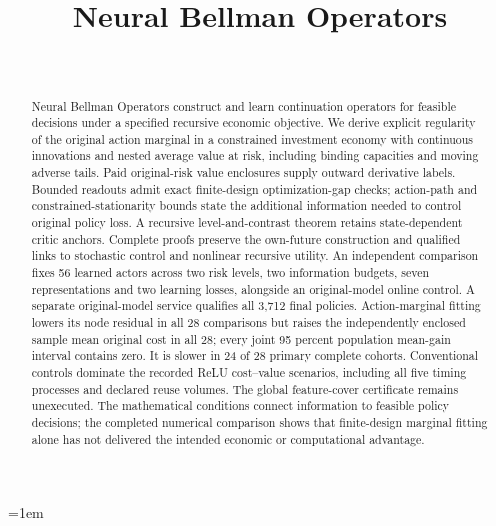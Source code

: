 \documentclass[ecta,nameyear,draft]{econsocart}
\begin{document}
\begin{frontmatter}
\title{Neural Bellman Operators}
\begin{aug}
\author[id=au1,addressref={add1}]{~}
\address[id=add1]{Peking University}
\end{aug}
\begin{abstract}
Neural Bellman Operators construct and learn continuation operators for feasible
decisions under a specified recursive economic objective. We derive explicit
regularity of the original action marginal in a constrained investment economy
with continuous innovations and nested average value at risk, including binding
capacities and moving adverse tails. Paid original-risk value enclosures supply
outward derivative labels. Bounded readouts admit exact finite-design
optimization-gap checks; action-path and constrained-stationarity bounds
state the additional information needed to control original policy loss.
A recursive level-and-contrast theorem retains state-dependent critic anchors.
Complete proofs preserve the own-future construction and qualified links to
stochastic control and nonlinear recursive utility. An independent comparison
fixes 56 learned actors across two risk levels, two information budgets,
seven representations and two learning losses, alongside an original-model
online control. A separate
original-model service qualifies all 3,712 final policies. Action-marginal
fitting lowers its node residual in all 28 comparisons but raises the
independently enclosed sample mean original cost in all 28; every joint
95 percent population mean-gain interval contains zero. It is slower in
24 of 28 primary complete cohorts. Conventional controls dominate the recorded
ReLU cost--value scenarios, including all five timing processes and declared
reuse volumes. The global feature-cover certificate remains unexecuted.
The mathematical conditions connect information to feasible policy decisions;
the completed numerical comparison shows that finite-design marginal fitting
alone has not delivered the intended economic or computational advantage.
\end{abstract}
\begin{keyword}
\end{keyword}
\end{frontmatter}









\begingroup\emergencystretch=1em

\endgroup
\end{document}
